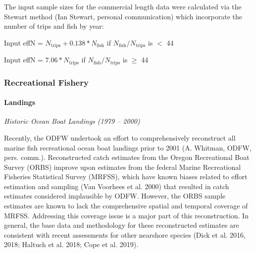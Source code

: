 \documentclass[11pt,
  english,
  a4paper,
]{article}
\begin{document}
\leavevmode\tagmcend\tagstructend\par


The input sample sizes for the commercial length data were calculated via the Stewart method (Ian Stewart, personal communication) which incorporate the number of trips and fish by year:

\leavevmode\tagmcend\tagstructend\par

\begin{centering}

Input effN = $N_{\text{trips}} + 0.138 * N_{\text{fish}}$ if $N_{\text{fish}}/N_{\text{trips}}$ is $<$ 44

Input effN = $7.06 * N_{\text{trips}}$ if $N_{\text{fish}}/N_{\text{trips}}$ is $\geq$ 44

\end{centering}


\hypertarget{recreational-fishery}{%
\subsubsection{Recreational Fishery}\label{recreational-fishery}}

\leavevmode\tagmcend\tagstructend


\hypertarget{landings-1}{%
\paragraph{Landings}\label{landings-1}}

\leavevmode\tagmcend\tagstructend


\emph{Historic Ocean Boat Landings (1979 -- 2000)}

\leavevmode\tagmcend\tagstructend\par


Recently, the ODFW undertook an effort to comprehensively reconstruct all marine fish recreational ocean boat landings prior to 2001 (A. Whitman, ODFW, pers. comm.). Reconstructed catch estimates from the Oregon Recreational Boat Survey (ORBS) improve upon estimates from the federal Marine Recreational Fisheries Statistical Survey (MRFSS), which have known biases related to effort estimation and sampling {(Van Voorhees et al. 2000)\leavevmode\tagmcend\tagstructend} that resulted in catch estimates considered implausible by ODFW. However, the ORBS sample estimates are known to lack the comprehensive spatial and temporal coverage of MRFSS. Addressing this coverage issue is a major part of this reconstruction. In general, the base data and methodology for these reconstructed estimates are consistent with recent assessments for other nearshore species {(Dick et al. 2016, 2018; Haltuch et al. 2018; Cope et al. 2019)\leavevmode\tagmcend\tagstructend}.
\end{document}
